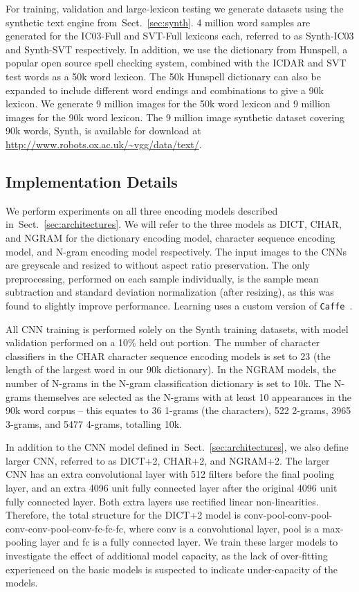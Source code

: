 \documentclass{article} \usepackage{nips14submit_e,times}
\newcommand{\sref}[1]{Sect.~\ref{#1}}
\begin{document}
For training, validation and large-lexicon testing we generate datasets using the synthetic text engine from~\sref{sec:synth}. 4 million word samples are generated for the IC03-Full and SVT-Full lexicons each, referred to as Synth-IC03 and Synth-SVT respectively. In addition, we use the dictionary from Hunspell, a popular open source spell checking system, combined with the ICDAR and SVT test words as a 50k word lexicon. The 50k Hunspell dictionary can also be expanded to include different word endings and combinations to give a 90k lexicon. We generate 9 million images for the 50k word lexicon and 9 million images for the 90k word lexicon. The 9 million image synthetic dataset covering 90k words, Synth, is available for download at {\small\url{http://www.robots.ox.ac.uk/~vgg/data/text/}}.

\subsection{Implementation Details}\label{sec:implementation}
We perform experiments on all three encoding models described in~\sref{sec:architectures}. We will refer to the three models as DICT, CHAR, and NGRAM for the dictionary encoding model, character sequence encoding model, and N-gram encoding model respectively. The input images to the CNNs are greyscale and resized to  without aspect ratio preservation. 
The only preprocessing, performed on each sample individually, is the sample mean subtraction and standard deviation normalization (after resizing), as this was found to slightly improve performance.
Learning uses a custom version of \texttt{Caffe}~\cite{Jia13}.

All CNN training is performed solely on the Synth training datasets, with model validation performed on a 10\% held out portion. The number of character classifiers in the CHAR character sequence encoding models is set to 23 (the length of the largest word in our 90k dictionary). In the NGRAM models, the number of N-grams in the N-gram classification dictionary is set to 10k. The N-grams themselves are selected as the N-grams with at least 10 appearances in the 90k word corpus -- this equates to 36 1-grams (the characters), 522 2-grams, 3965 3-grams, and 5477 4-grams, totalling 10k.

In addition to the CNN model defined in~\sref{sec:architectures}, we also define larger CNN, referred to as DICT+2, CHAR+2, and NGRAM+2. The larger CNN has an extra  convolutional layer with 512 filters before the final pooling layer, and an extra 4096 unit fully connected layer after the original 4096 unit fully connected layer. Both extra layers use rectified linear non-linearities. Therefore, the total structure for the DICT+2 model is conv-pool-conv-pool-conv-conv-pool-conv-fc-fc-fc, where conv is a convolutional layer, pool is a max-pooling layer and fc is a fully connected layer. We train these larger models to investigate the effect of additional model capacity, as the lack of over-fitting experienced on the basic models is suspected to indicate under-capacity of the models.
\end{document}
